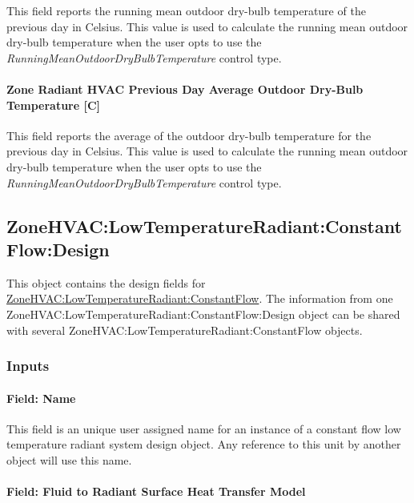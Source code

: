 This field reports the running mean outdoor dry-bulb temperature of the previous day in Celsius. This value is used to calculate the running mean outdoor dry-bulb temperature when the user opts to use the \emph{RunningMeanOutdoorDryBulbTemperature} control type.

\paragraph{Zone Radiant HVAC Previous Day Average Outdoor Dry-Bulb Temperature {[}C{]}}\label{zone-radiant-hvac-previous-day-average-outdoor-dry-bulb-temperature}

This field reports the average of the outdoor dry-bulb temperature for the previous day in Celsius. This value is used to calculate the running mean outdoor dry-bulb temperature when the user opts to use the \emph{RunningMeanOutdoorDryBulbTemperature} control type.

\subsection{ZoneHVAC:LowTemperatureRadiant:ConstantFlow:Design}\label{ConstFlowDesign}

This object contains the design fields for \hyperref[zonehvaclowtemperatureradiantconstantflow]{ZoneHVAC:LowTemperatureRadiant:ConstantFlow}.
The information from one ZoneHVAC:LowTemperatureRadiant:ConstantFlow:Design object can be shared with several ZoneHVAC:LowTemperatureRadiant:ConstantFlow objects.

\subsubsection{Inputs}

\paragraph{Field: Name}\label{ConstFlowDesignName}

This field is an unique user assigned name for an instance of a constant flow low temperature radiant system design object. Any reference to this unit by another object will use this name.

\paragraph{Field: Fluid to Radiant Surface Heat Transfer Model}\label{field-fluid-to-radiant-surface-heat-transfer-model-001}

